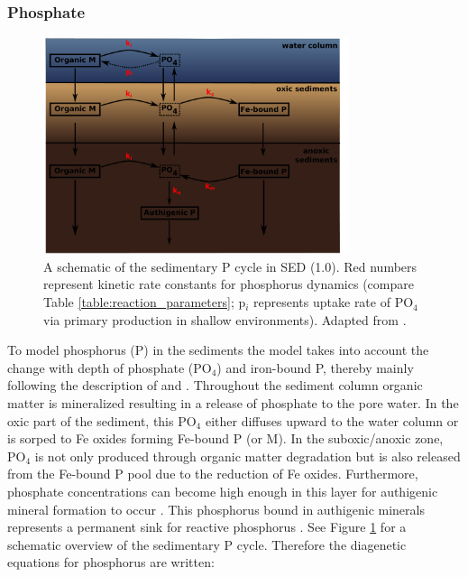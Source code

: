 \documentclass[gmd, manuscript]{copernicus}
\begin{document}
\subsubsection{Phosphate}
\begin{figure}[htbp]
\begin{center}
	\includegraphics[width=0.8\textwidth]{figures/P-cycle.pdf}
	\caption{A schematic of the sedimentary P cycle in SED (1.0). Red numbers represent kinetic rate constants for phosphorus dynamics (compare Table \ref{table:reaction_parameters}; p$_i$ represents uptake rate of PO$_4$ 
	via primary production in shallow environments). Adapted from \citet{caroline_p_slomp_key_1996}.}
	\label{fig:P-cycle}
	\end{center}
\end{figure}
To model phosphorus (P) in the sediments the model takes into account the change with depth of phosphate (PO$_4$) and iron-bound P, thereby mainly following the description of \citet{caroline_p_slomp_key_1996} 
and \citet{gypens_simple_2008}. Throughout the sediment column organic matter is mineralized resulting in a release of phosphate to the pore water. In the oxic part of the sediment, this PO$_4$ either 
diffuses upward to the water column or is sorped to Fe oxides forming Fe-bound P (or M)\citep{slomp1998role}. In the suboxic/anoxic zone, PO$_4$ is not only produced through organic matter degradation but is 
also released from the Fe-bound P pool due to the reduction of Fe oxides. Furthermore, phosphate concentrations can become high enough in this layer for authigenic mineral formation to occur \citep{cappellen_mathematical_1988}. 
This phosphorus bound in authigenic minerals represents a permanent sink for reactive phosphorus \citep{caroline_p_slomp_key_1996}. See Figure \ref{fig:P-cycle} for a schematic overview of the sedimentary P cycle.
Therefore the diagenetic equations for phosphorus are written:
\end{document}
